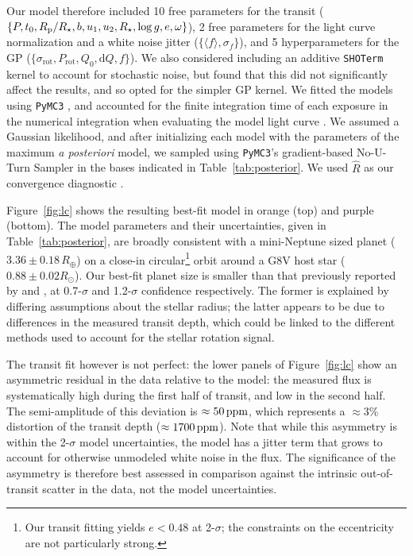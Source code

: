 \documentclass[12pt,modern,twocolumn,tighten]{aastex63}
\begin{document}
Our model therefore included 10 free parameters for the transit ($\{P,
t_0, R_{\rm p}/R_\star, b, u_1 ,u_2 ,R_\star, \log g, e, \omega \}$),
2 free parameters for the light curve normalization and a white noise 
jitter ($\{\langle f \rangle, \sigma_f \}$), and 5
hyperparameters for the GP ($\{\sigma_{\mathrm{rot}},
P_{\mathrm{rot}}, Q_0, \mathrm{d}Q, f \}$).  We also considered
including an additive \texttt{SHOTerm} kernel to account for
stochastic noise, but found that this did not significantly affect the
results, and so opted for the simpler GP kernel.  We fitted the models
using \texttt{PyMC3} \citep{salvatier_2016_PyMC3,exoplanet:theano},
and accounted for the finite integration time of each exposure in the
numerical integration when evaluating the model light curve
\citep[see][]{kipping_binning_2010}.  We assumed a Gaussian
likelihood, and after initializing each model with the parameters of
the maximum {\it a posteriori} model, we sampled using
\texttt{PyMC3}'s gradient-based No-U-Turn Sampler
\citep{hoffman_no-u-turn_2014} in the bases indicated in
Table~\ref{tab:posterior}.  We used $\hat{R}$ as our convergence
diagnostic \citep{gelman_inference_1992}.

Figure~\ref{fig:lc} shows the resulting best-fit model in orange (top) and
purple (bottom).
The model parameters and their uncertainties, given in Table~\ref{tab:posterior}, are
broadly consistent with a mini-Neptune sized planet ($3.36\pm0.18\,R_\oplus$) on a close-in circular\footnote{ Our transit fitting
	yields $e<0.48$ at 2-$\sigma$; the constraints on the eccentricity are
	not particularly strong.} orbit around a G8V host star ($0.88 \pm 0.02
R_\odot$).  Our best-fit planet size is smaller than that
previously reported by \citet{morton_false_2016} and
\citet{berger_identifying_2018}, at 0.7-$\sigma$ and 1.2-$\sigma$
confidence respectively.  The former is explained by differing
assumptions about the stellar radius; the latter appears to be due to
differences in the measured transit depth, which could be linked to
the different methods used to account for the stellar rotation signal.

The transit fit however is not perfect: the lower panels of
Figure~\ref{fig:lc} show an asymmetric
residual in the data relative to the model: the measured flux is systematically
high during the first half of transit, and low in the second half.  The
semi-amplitude of this deviation is $\approx50\,{\rm ppm}$, which
represents a $\approx 3\%$ distortion of the transit depth
($\approx1700\,{\rm ppm}$).  
Note that
while this asymmetry is within the 2-$\sigma$ model
uncertainties, the model has a jitter term that grows to
account for otherwise unmodeled white noise in the flux.  The
significance of the asymmetry is therefore best assessed in comparison
against the intrinsic out-of-transit scatter in the data, not the model
uncertainties.
\end{document}

